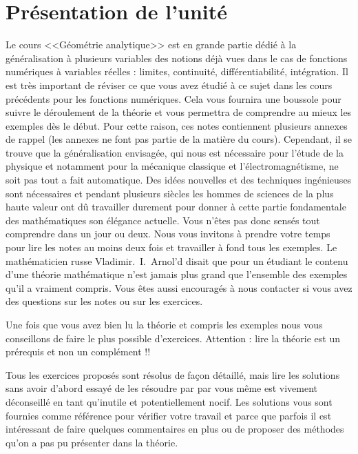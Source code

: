 \section*{Présentation de l'unité}

Le cours <<Géométrie analytique>> est en grande partie dédié à la généralisation à plusieurs variables des notions déjà vues dans le cas de fonctions numériques à variables réelles : limites, continuité, différentiabilité, intégration. Il est très important de réviser ce que vous avez étudié à ce sujet dans les cours précédents pour les fonctions numériques. Cela vous fournira une boussole pour suivre le déroulement de la théorie et vous permettra de comprendre au mieux les exemples dès le début. Pour cette raison, ces notes contiennent plusieurs annexes de rappel (les annexes ne font pas partie de la matière du cours). Cependant, il se trouve que la généralisation envisagée, qui nous est nécessaire pour l'étude de la physique et notamment pour la mécanique classique et l'électromagnétisme, ne soit pas tout a fait automatique. Des idées nouvelles et des techniques ingénieuses sont nécessaires et pendant plusieurs siècles les hommes de sciences de la plus haute valeur ont dû travailler durement pour donner à cette partie fondamentale des mathématiques son élégance actuelle. Vous n'êtes pas donc sensés tout comprendre dans un jour ou deux. Nous vous invitons à prendre votre temps pour lire les notes au moins deux fois et travailler à fond tous les exemples. Le mathématicien russe Vladimir.~I.~Arnol'd disait que pour un étudiant le contenu d'une théorie mathématique n'est jamais plus grand que l'ensemble des exemples qu'il a vraiment compris. Vous êtes aussi encouragés à nous contacter si vous avez des questions sur les notes ou sur les exercices.  

Une fois que vous avez bien lu la théorie et compris les exemples nous vous conseillons de faire le plus possible d'exercices. Attention : lire la théorie est un prérequis et non un complément !! 

Tous les exercices proposés sont résolus de façon détaillé, mais lire les solutions sans avoir d'abord essayé de les résoudre par par vous même est vivement déconseillé en tant qu'inutile et potentiellement nocif. Les solutions vous sont fournies comme référence pour vérifier votre travail et parce que parfois il est intéressant de faire quelques commentaires en plus ou de proposer des méthodes qu'on a pas pu présenter dans la théorie. 

